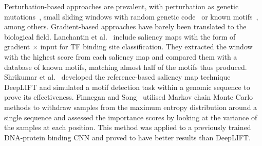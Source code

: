 \documentclass{article}
\begin{document}
%


Perturbation-based approaches are prevalent, with perturbation as genetic mutations~\cite{Alipanahi2015,Zhou2015}, small sliding windows with random genetic code~\cite{Umarov2017} or known motifs~\cite{Kelley2016}, among others. Gradient-based approaches have barely been translated to the biological field. Lanchantin et al.~\cite{Lanchantin2016} include saliency maps with the form of gradient $\times$ input for TF binding site classification. They extracted the window with the highest score from each saliency map and compared them with a database of known motifs, matching almost half of the motifs thus produced. Shrikumar et al.~\cite{Shrikumar2017} developed the reference-based saliency map technique DeepLIFT and simulated a motif detection task within a genomic sequence to prove its effectiveness. Finnegan and Song~\cite{Finnegan2017} utilised Markov chain Monte Carlo methods to withdraw samples from the maximum entropy distribution around a single sequence and assessed the importance scores by looking at the variance of the samples at each position. This method was applied to a previously trained DNA-protein binding CNN and proved to have better results than DeepLIFT.
\end{document}
